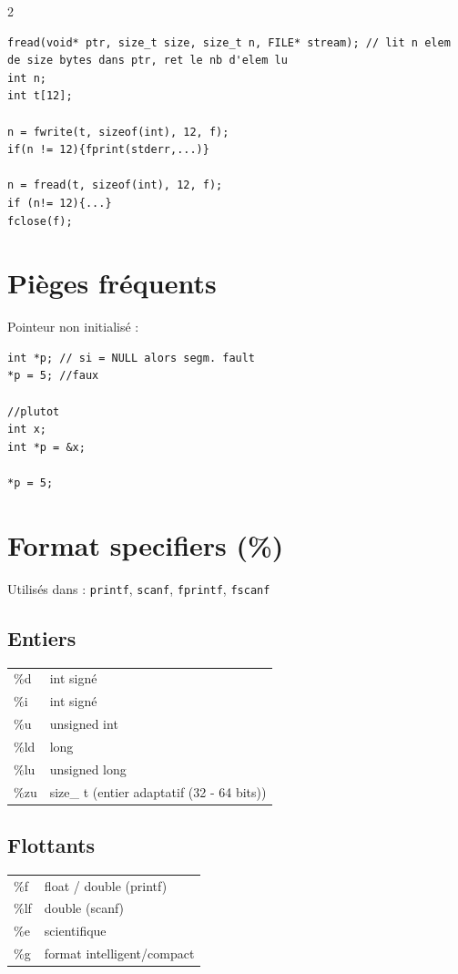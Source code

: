 \documentclass[8pt]{article}
\begin{document}
\begin{multicols}{2}
\begin{lstlisting}
fread(void* ptr, size_t size, size_t n, FILE* stream); // lit n elem de size bytes dans ptr, ret le nb d'elem lu
int n;
int t[12];

n = fwrite(t, sizeof(int), 12, f);
if(n != 12){fprint(stderr,...)}

n = fread(t, sizeof(int), 12, f);
if (n!= 12){...}
fclose(f);
\end{lstlisting}

\section{Pièges fréquents}

Pointeur non initialisé :

\begin{lstlisting}
int *p; // si = NULL alors segm. fault
*p = 5; //faux

//plutot 
int x;
int *p = &x;

*p = 5;
\end{lstlisting}
\section{Format specifiers (\%)}

Utilisés dans : \texttt{printf}, \texttt{scanf}, \texttt{fprintf}, \texttt{fscanf}

\subsection{Entiers}

\begin{tabular}{ll}
\%d & int signé \\
\%i & int signé \\
\%u & unsigned int \\
\%ld & long \\
\%lu & unsigned long \\
\%zu & size_ t (entier adaptatif (32 - 64 bits))
\end{tabular}

\subsection{Flottants}

\begin{tabular}{ll}
\%f & float / double (printf) \\
\%lf & double (scanf) \\
\%e & scientifique \\
\%g & format intelligent/compact \\
\end{tabular}


\end{multicols}
\end{document}
